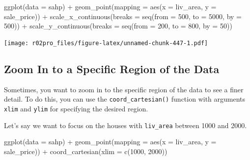 \documentclass[
]{book}
\newenvironment{Shaded}{\begin{snugshade}}{\end{snugshade}}
\newcommand{\AttributeTok}[1]{\textcolor[rgb]{0.77,0.63,0.00}{#1}}
\newcommand{\DecValTok}[1]{\textcolor[rgb]{0.00,0.00,0.81}{#1}}
\newcommand{\FunctionTok}[1]{\textcolor[rgb]{0.00,0.00,0.00}{#1}}
\newcommand{\NormalTok}[1]{#1}
\newcommand{\SpecialCharTok}[1]{\textcolor[rgb]{0.00,0.00,0.00}{#1}}
\begin{document}
\begin{Shaded}
\begin{Highlighting}[]
\FunctionTok{ggplot}\NormalTok{(}\AttributeTok{data =}\NormalTok{ sahp) }\SpecialCharTok{+} \FunctionTok{geom\_point}\NormalTok{(}\AttributeTok{mapping =} \FunctionTok{aes}\NormalTok{(}\AttributeTok{x =}\NormalTok{ liv\_area, }\AttributeTok{y =}\NormalTok{ sale\_price)) }\SpecialCharTok{+}
  \FunctionTok{scale\_x\_continuous}\NormalTok{(}\AttributeTok{breaks =} \FunctionTok{seq}\NormalTok{(}\AttributeTok{from =} \DecValTok{500}\NormalTok{, }\AttributeTok{to =} \DecValTok{5000}\NormalTok{, }\AttributeTok{by =} \DecValTok{500}\NormalTok{)) }\SpecialCharTok{+}
  \FunctionTok{scale\_y\_continuous}\NormalTok{(}\AttributeTok{breaks =} \FunctionTok{seq}\NormalTok{(}\AttributeTok{from =} \DecValTok{200}\NormalTok{, }\AttributeTok{to =} \DecValTok{800}\NormalTok{, }\AttributeTok{by =} \DecValTok{50}\NormalTok{))}
\end{Highlighting}
\end{Shaded}

\texttt{[image: r02pro\_files/figure-latex/unnamed-chunk-447-1.pdf]}

\hypertarget{zoom-in-to-a-specific-region-of-the-data}{%
\subsection{Zoom In to a Specific Region of the Data}\label{zoom-in-to-a-specific-region-of-the-data}}

Sometimes, you want to zoom in to the specific region of the data to see a finer detail. To do this, you can use the \texttt{coord\_cartesian()} function with arguments \texttt{xlim} and \texttt{ylim} for specifying the desired region.

Let's say we want to focus on the houses with \texttt{liv\_area} between 1000 and 2000.

\begin{Shaded}
\begin{Highlighting}[]
\FunctionTok{ggplot}\NormalTok{(}\AttributeTok{data =}\NormalTok{ sahp) }\SpecialCharTok{+} \FunctionTok{geom\_point}\NormalTok{(}\AttributeTok{mapping =} \FunctionTok{aes}\NormalTok{(}\AttributeTok{x =}\NormalTok{ liv\_area, }\AttributeTok{y =}\NormalTok{ sale\_price))  }\SpecialCharTok{+}
  \FunctionTok{coord\_cartesian}\NormalTok{(}\AttributeTok{xlim =} \FunctionTok{c}\NormalTok{(}\DecValTok{1000}\NormalTok{, }\DecValTok{2000}\NormalTok{))}
\end{Highlighting}
\end{Shaded}
\end{document}
